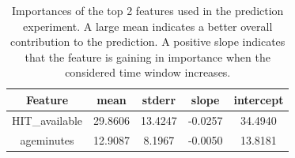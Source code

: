 \begin{table}[t!]
\begin{center}
\scriptsize
\caption {Importances of the top 2 features used in the prediction experiment. A large mean indicates a better overall contribution to the prediction. A positive slope indicates that the feature is gaining in importance when the considered time window increases.}
\begin{tabular}{|c|c|c|c|c|}
\hline
Feature              & mean      & stderr    & slope     & intercept \\
\hline
HIT\_available      & 29.8606 & 13.4247 & -0.0257 & 34.4940 \\
ageminutes           & 12.9087 &  8.1967 & -0.0050 & 13.8181 \\

\end{tabular}
\end{center}
\end{table}
